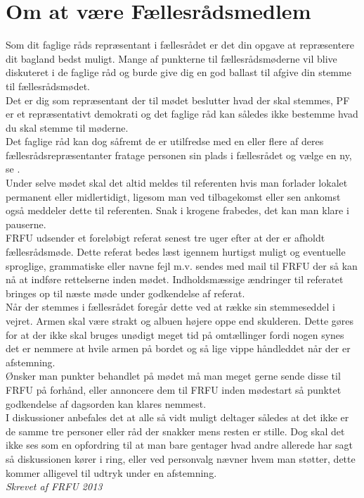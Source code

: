 \section*{Om at være Fællesrådsmedlem}
Som dit faglige råds repræsentant i fællesrådet er det din opgave at repræsentere dit bagland bedst muligt. Mange af punkterne til fællesrådsmøderne vil blive diskuteret i de faglige råd og burde give dig en god ballast til afgive din stemme til fællesrådsmødet.\\

Det er dig som repræsentant der til mødet beslutter hvad der skal stemmes, PF er et repræsentativt demokrati og det faglige råd kan således ikke bestemme hvad du skal stemme til møderne.\\

Det faglige råd kan dog såfremt de er utilfredse med en eller flere af deres fællesrådsrepræsentanter fratage personen sin plads i fællesrådet og vælge en ny, se .\\ 

Under selve mødet skal det altid meldes til referenten hvis man forlader lokalet permanent eller midlertidigt, ligesom man ved tilbagekomst eller sen ankomst også meddeler dette til referenten.
Snak i krogene frabedes, det kan man klare i pauserne.\\

FRFU udsender et foreløbigt referat senest tre uger efter at der er afholdt fællesrådsmøde. Dette referat bedes læst igennem hurtigst muligt og eventuelle sproglige, grammatiske eller navne fejl m.v. sendes med mail til FRFU der så kan nå at indføre rettelserne inden mødet. Indholdsmæssige ændringer til referatet bringes op til næste møde under godkendelse af referat.\\

Når der stemmes i fællesrådet foregår dette ved at række sin stemmeseddel i vejret. Armen skal være strakt og albuen højere oppe end skulderen. Dette gøres for at der ikke skal bruges unødigt meget tid på omtællinger fordi nogen synes det er nemmere at hvile armen på bordet og så lige vippe håndleddet når der er afstemning.\\

Ønsker man punkter behandlet på mødet må man meget gerne sende disse til FRFU på forhånd, eller annoncere dem til FRFU inden mødestart så punktet godkendelse af dagsorden kan klares nemmest.\\
I diskussioner anbefales det at alle så vidt muligt deltager således at det ikke er de samme tre personer eller råd der snakker mens resten er stille. Dog skal det ikke ses som en opfordring til at man bare gentager hvad andre allerede har sagt så diskussionen kører i ring, eller ved personvalg nævner hvem man støtter, dette kommer alligevel til udtryk under en afstemning.
\\
\textit{Skrevet af FRFU 2013}